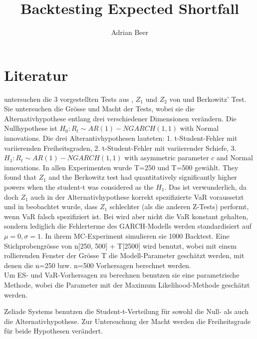 \documentclass[12pt,a4paper]{article}
\title{Backtesting Expected Shortfall}
\author{Adrian Beer}
\date{\vspace{-10ex}}
\begin{document}
	\maketitle
	\tableofcontents 
	

	\section{Literatur}
	\cite{garcia_performance_2019} untersuchen die 3 vorgestellten Tests aus \cite{kratz_multinomial_2016}, $Z_1$ und $Z_2$ von \cite{acerbi_back-testing_2014} und Berkowitz' Test.
	Sie untersuchen die Grösse und Macht der Tests, wobei sie die Alternativhypothese entlang drei verschiedener Dimensionen verändern.
	Die Nullhypothese ist $H_0: R_t \sim A R(1)-N G A R C H(1,1)$ with Normal innovations. 
	Die drei Alterantivhypothesen lauteten: 
	1. t-Student-Fehler mit variierenden Freiheitsgraden, 
	2. t-Student-Fehler mit variierender Schiefe,
	3. $H_1: R_t \sim A R(1)-N G A R C H(1,1)$ with asymmetric parameter $c$ and Normal innovations.
	In allen Experimenten wurde T=250 und T=500 gewählt.
	They found that $Z_1$ and the Berkowitz test had quantitatively significantly higher powers when the student-t was considered as the $H_1$.
	Das ist verwunderlich, da doch $Z_1$ auch in der Alternativhypothese korrekt spezifizierte VaR voraussetzt und in \cite{berglund_backtesting_2022} beobachtet wurde, dass $Z_1$ schlechter (als die anderen Z-Tests) performt, wenn VaR falsch spezifiziert ist.
	Bei \cite{garcia_performance_2019} wird aber nicht die VaR konstant gehalten, sondern lediglich die Fehlerterme des GARCH-Modells werden standardisiert auf $\mu=0, \sigma=1$.
	In ihrem MC-Experiment simulieren sie 1000 Backtest. 
	Eine Stichprobengrösse von n[250, 500] + T[2500] wird benutzt, wobei mit einem rollierenden Fenster der Grösse T die Modell-Parameter geschätzt werden, mit denen die n=250 bzw. n=500 Vorhersagen berechnet werden.\\
	Um ES- und VaR-Vorhersagen zu berechnen benutzen sie eine parametrische Methode, wobei die Parameter mit der Maximum Likelihood-Methode geschätzt werden.
	
	
	Zeliade Systems benutzen die Student-t-Verteilung für sowohl die Null- als auch die Alternativhypothese. 
	Zur Untersuchung der Macht werden die Freiheitsgrade für beide Hypothesen verändert.\\
\end{document}
